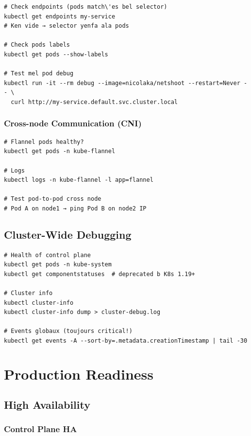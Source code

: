 \documentclass[11pt,a4paper]{book}
\begin{document}
\begin{lstlisting}
# Check endpoints (pods match\'es bel selector)
kubectl get endpoints my-service
# Ken vide → selector yenfa ala pods

# Check pods labels
kubectl get pods --show-labels

# Test mel pod debug
kubectl run -it --rm debug --image=nicolaka/netshoot --restart=Never -- \
  curl http://my-service.default.svc.cluster.local
\end{lstlisting}

\subsection{Cross-node Communication (CNI)}

\begin{lstlisting}
# Flannel pods healthy?
kubectl get pods -n kube-flannel

# Logs
kubectl logs -n kube-flannel -l app=flannel

# Test pod-to-pod cross node
# Pod A on node1 → ping Pod B on node2 IP
\end{lstlisting}

\section{Cluster-Wide Debugging}

\begin{lstlisting}
# Health of control plane
kubectl get pods -n kube-system
kubectl get componentstatuses  # deprecated b K8s 1.19+

# Cluster info
kubectl cluster-info
kubectl cluster-info dump > cluster-debug.log

# Events globaux (toujours critical!)
kubectl get events -A --sort-by=.metadata.creationTimestamp | tail -30
\end{lstlisting}

\cleardoublepage

\chapter{Production Readiness}

\section{High Availability}

\subsection{Control Plane HA}
\end{document}
